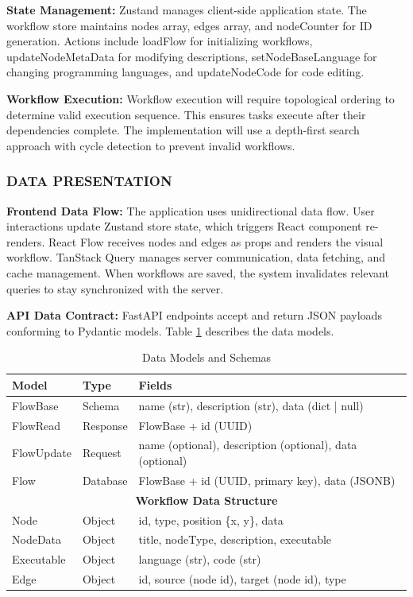 \documentclass[12pt]{article}
\begin{document}
\hspace{\parindent}\textbf{State Management:} Zustand manages client-side application state. The workflow store maintains nodes array, edges array, and nodeCounter for ID generation. Actions include loadFlow for initializing workflows, updateNodeMetaData for modifying descriptions, setNodeBaseLanguage for changing programming languages, and updateNodeCode for code editing.

\hspace{\parindent}\textbf{Workflow Execution:} Workflow execution will require topological ordering to determine valid execution sequence. This ensures tasks execute after their dependencies complete. The implementation will use a depth-first search approach with cycle detection to prevent invalid workflows.

\subsubsection{DATA PRESENTATION}

\hspace{\parindent}\textbf{Frontend Data Flow:} The application uses unidirectional data flow. User interactions update Zustand store state, which triggers React component re-renders. React Flow receives nodes and edges as props and renders the visual workflow. TanStack Query manages server communication, data fetching, and cache management. When workflows are saved, the system invalidates relevant queries to stay synchronized with the server.

\hspace{\parindent}\textbf{API Data Contract:} FastAPI endpoints accept and return JSON payloads conforming to Pydantic models. Table \ref{tab:data_models} describes the data models.

\begin{table}[h]
\centering
\caption{Data Models and Schemas}
\label{tab:data_models}
\begin{tabular}{|l|l|p{6cm}|}
\hline
\textbf{Model} & \textbf{Type} & \textbf{Fields} \\
\hline
FlowBase & Schema & name (str), description (str), data (dict | null) \\
FlowRead & Response & FlowBase + id (UUID) \\
FlowUpdate & Request & name (optional), description (optional), data (optional) \\
Flow & Database & FlowBase + id (UUID, primary key), data (JSONB) \\
\hline
\multicolumn{3}{|c|}{\textbf{Workflow Data Structure}} \\
\hline
Node & Object & id, type, position \{x, y\}, data \\
NodeData & Object & title, nodeType, description, executable \\
Executable & Object & language (str), code (str) \\
Edge & Object & id, source (node id), target (node id), type \\
\hline
\end{tabular}
\end{table}
\end{document}
